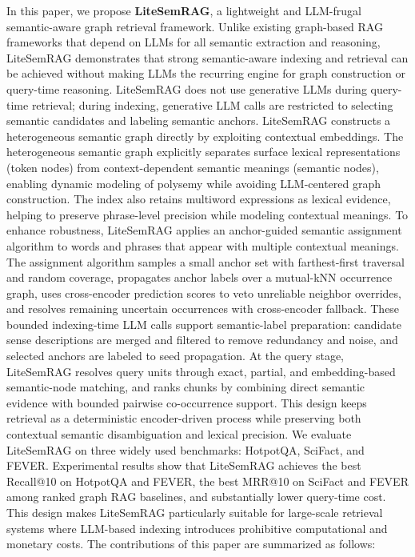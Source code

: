 \documentclass[conference]{IEEEtran}
\begin{document}
In this paper, we propose \textbf{LiteSemRAG}, a lightweight and LLM-frugal semantic-aware graph retrieval framework. Unlike existing graph-based RAG frameworks that depend on LLMs for all semantic extraction and reasoning, LiteSemRAG demonstrates that strong semantic-aware indexing and retrieval can be achieved without making LLMs the recurring engine for graph construction or query-time reasoning. LiteSemRAG does not use generative LLMs during query-time retrieval; during indexing, generative LLM calls are restricted to selecting semantic candidates and labeling semantic anchors. LiteSemRAG constructs a heterogeneous semantic graph directly by exploiting contextual embeddings. The heterogeneous semantic graph explicitly separates surface lexical representations (token nodes) from context-dependent semantic meanings (semantic nodes), enabling dynamic modeling of polysemy while avoiding LLM-centered graph construction. The index also retains multiword expressions as lexical evidence, helping to preserve phrase-level precision while modeling contextual meanings. To enhance robustness, LiteSemRAG applies an anchor-guided semantic assignment algorithm to words and phrases that appear with multiple contextual meanings. The assignment algorithm samples a small anchor set with farthest-first traversal and random coverage, propagates anchor labels over a mutual-kNN occurrence graph, uses cross-encoder prediction scores to veto unreliable neighbor overrides, and resolves remaining uncertain occurrences with cross-encoder fallback. These bounded indexing-time LLM calls support semantic-label preparation: candidate sense descriptions are merged and filtered to remove redundancy and noise, and selected anchors are labeled to seed propagation. At the query stage, LiteSemRAG resolves query units through exact, partial, and embedding-based semantic-node matching, and ranks chunks by combining direct semantic evidence with bounded pairwise co-occurrence support. This design keeps retrieval as a deterministic encoder-driven process while preserving both contextual semantic disambiguation and lexical precision.
We evaluate LiteSemRAG on three widely used benchmarks: HotpotQA, SciFact, and FEVER. Experimental results show that LiteSemRAG achieves the best Recall@10 on HotpotQA and FEVER, the best MRR@10 on SciFact and FEVER among ranked graph RAG baselines, and substantially lower query-time cost. This design makes LiteSemRAG particularly suitable for large-scale retrieval systems where LLM-based indexing introduces prohibitive computational and monetary costs.
The contributions of this paper are summarized as follows:
\end{document}
